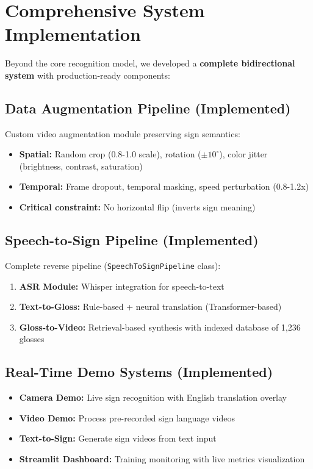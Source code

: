 \documentclass[12pt,a4paper]{article}
\begin{document}
\section{Comprehensive System Implementation}

Beyond the core recognition model, we developed a \textbf{complete bidirectional system} with production-ready components:

\subsection{Data Augmentation Pipeline (Implemented)}

Custom video augmentation module preserving sign semantics:
\begin{itemize}[noitemsep]
    \item \textbf{Spatial:} Random crop (0.8-1.0 scale), rotation ($\pm 10^{\circ}$), color jitter (brightness, contrast, saturation)
    \item \textbf{Temporal:} Frame dropout, temporal masking, speed perturbation (0.8-1.2x)
    \item \textbf{Critical constraint:} No horizontal flip (inverts sign meaning)
\end{itemize}

\subsection{Speech-to-Sign Pipeline (Implemented)}

Complete reverse pipeline (\texttt{SpeechToSignPipeline} class):
\begin{enumerate}[noitemsep]
    \item \textbf{ASR Module:} Whisper integration for speech-to-text
    \item \textbf{Text-to-Gloss:} Rule-based + neural translation (Transformer-based)
    \item \textbf{Gloss-to-Video:} Retrieval-based synthesis with indexed database of 1,236 glosses
\end{enumerate}

\subsection{Real-Time Demo Systems (Implemented)}

\begin{itemize}[noitemsep]
    \item \textbf{Camera Demo:} Live sign recognition with English translation overlay
    \item \textbf{Video Demo:} Process pre-recorded sign language videos
    \item \textbf{Text-to-Sign:} Generate sign videos from text input
    \item \textbf{Streamlit Dashboard:} Training monitoring with live metrics visualization
\end{itemize}
\end{document}
